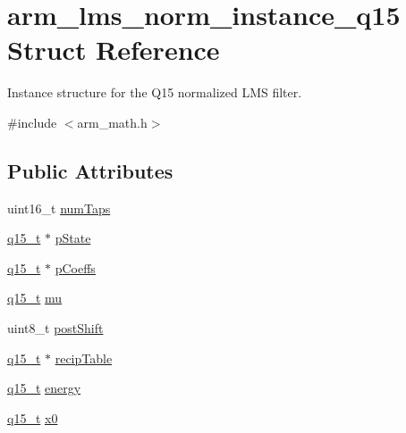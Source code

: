 \hypertarget{structarm__lms__norm__instance__q15}{}\section{arm\+\_\+lms\+\_\+norm\+\_\+instance\+\_\+q15 Struct Reference}
\label{structarm__lms__norm__instance__q15}


Instance structure for the Q15 normalized L\+MS filter.  




{\ttfamily \#include $<$arm\+\_\+math.\+h$>$}

\subsection*{Public Attributes}
\begin{DoxyCompactItemize}
\item 
uint16\+\_\+t \hyperlink{structarm__lms__norm__instance__q15_a9ee7a45f4f315d7996a969e25fdc7146}{num\+Taps}
\item 
\hyperlink{arm__math_8h_ab5a8fb21a5b3b983d5f54f31614052ea}{q15\+\_\+t} $\ast$ \hyperlink{structarm__lms__norm__instance__q15_aa4de490b3bdbd03561b76ee07901c8e3}{p\+State}
\item 
\hyperlink{arm__math_8h_ab5a8fb21a5b3b983d5f54f31614052ea}{q15\+\_\+t} $\ast$ \hyperlink{structarm__lms__norm__instance__q15_ae7bca648c75a2ffa02d87852bb78bc8a}{p\+Coeffs}
\item 
\hyperlink{arm__math_8h_ab5a8fb21a5b3b983d5f54f31614052ea}{q15\+\_\+t} \hyperlink{structarm__lms__norm__instance__q15_a7ce00f21d11cfda6d963240641deea8c}{mu}
\item 
uint8\+\_\+t \hyperlink{structarm__lms__norm__instance__q15_aa0d435fbcf7dedb7179d4467e9b79e9f}{post\+Shift}
\item 
\hyperlink{arm__math_8h_ab5a8fb21a5b3b983d5f54f31614052ea}{q15\+\_\+t} $\ast$ \hyperlink{structarm__lms__norm__instance__q15_a9aabb0e4c79f3db807e7a441fa36f5f8}{recip\+Table}
\item 
\hyperlink{arm__math_8h_ab5a8fb21a5b3b983d5f54f31614052ea}{q15\+\_\+t} \hyperlink{structarm__lms__norm__instance__q15_a1c81ded399919d8181026bc1c8602e7b}{energy}
\item 
\hyperlink{arm__math_8h_ab5a8fb21a5b3b983d5f54f31614052ea}{q15\+\_\+t} \hyperlink{structarm__lms__norm__instance__q15_a3fc1d6f97d2c6d5324871de6895cb7e9}{x0}
\end{DoxyCompactItemize}


